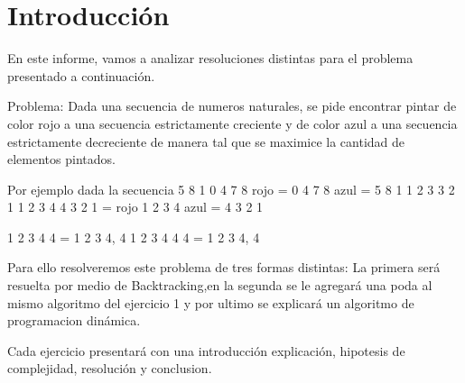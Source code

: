 \section{Introducción}

En este informe, vamos a analizar resoluciones distintas para el problema presentado a continuación.

Problema: Dada una secuencia de numeros naturales, se pide encontrar pintar de color rojo a una secuencia estrictamente creciente y de color azul a una secuencia estrictamente decreciente
de manera tal que se maximice la cantidad de elementos pintados.

Por ejemplo dada la secuencia 5 8 1 0 4 7 8  rojo = 0 4 7 8 azul = 5 8 1
1 2 3 3 2 1 1 2 3 4 4 3 2 1 = rojo 1 2 3 4 azul =  4 3 2 1

1 2 3 4 4  = 1 2 3 4,  4
1 2 3 4 4 4 = 1 2 3 4, 4



Para ello resolveremos este problema de tres formas distintas:
La primera será resuelta por medio de Backtracking,en la segunda se le agregará una poda al mismo algoritmo del ejercicio 1 y por ultimo se explicará un algoritmo de programacion dinámica.

Cada ejercicio presentará con una introducción explicación, hipotesis de complejidad, resolución y conclusion.
